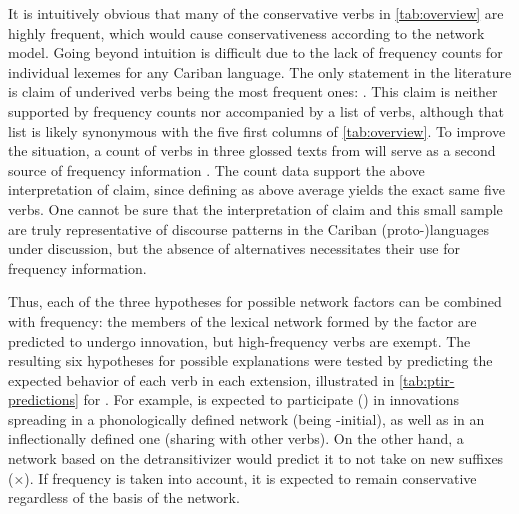 It is intuitively obvious that many of the conservative verbs in \cref{tab:overview} are highly frequent, which would cause conservativeness according to the network model.
Going beyond intuition is difficult due to the lack of frequency counts for individual lexemes for any Cariban language.
The only statement in the literature is  claim of \kalina underived  verbs being the most frequent ones: .
This claim is neither supported by frequency counts nor accompanied by a list of verbs, although that list is likely synonymous with the five first columns of \cref{tab:overview}.
To improve the situation, a count of  verbs in three glossed \apalai texts from \textcite{koehns1994textos} will serve as a second source of frequency information .
The count data support the above interpretation of  claim, since defining  as above average yields the exact same five verbs.
One cannot be sure that the interpretation of  claim and this small \apalai sample are truly representative of discourse patterns in the Cariban (proto-)languages under discussion, but the absence of alternatives necessitates their use for frequency information.




Thus, each of the three hypotheses for possible network factors can be combined with frequency: the members of the lexical network formed by the factor are predicted to undergo innovation, but high-frequency verbs are exempt.
The resulting six hypotheses for possible explanations were tested by predicting the expected behavior of each verb in each extension, illustrated in \cref{tab:ptir-predictions} for \PTir.
For example,   is expected to participate (\checkmark) in innovations spreading in a phonologically defined network (being -initial), as well as in an inflectionally defined one (sharing  with other  verbs).
On the other hand, a network based on the detransitivizer would predict it to not take on new suffixes (×).
If frequency is taken into account, it is expected to remain conservative regardless of the basis of the network.

